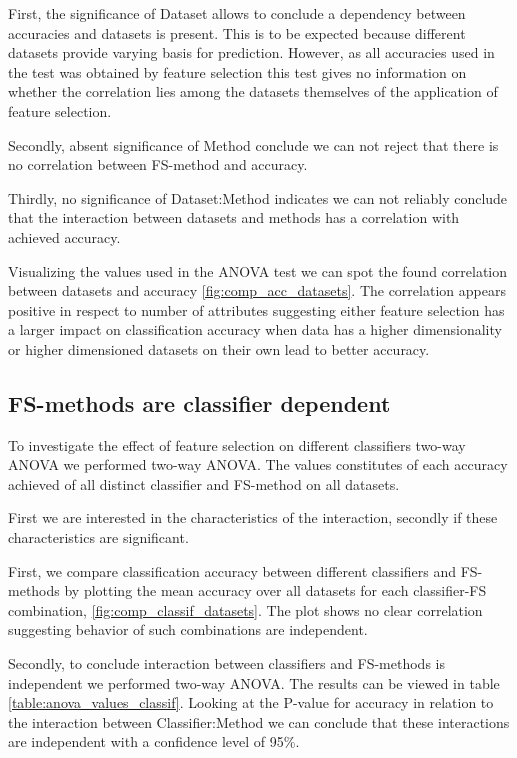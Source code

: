 First, the significance of Dataset allows to conclude a dependency between accuracies and datasets is present. This is to be expected because different datasets provide varying basis for prediction. However, as all accuracies used in the test was obtained by feature selection this test gives no information on whether the correlation lies among the datasets themselves of the application of feature selection.

Secondly, absent significance of Method conclude we can not reject that there is no correlation between FS-method and accuracy.

Thirdly, no significance of Dataset:Method indicates we can not reliably conclude that the interaction between datasets and methods has a correlation with achieved accuracy.

Visualizing the values used in the ANOVA test we can spot the found correlation between datasets and accuracy \ref{fig:comp_acc_datasets}. The correlation appears positive in respect to number of attributes suggesting either feature selection has a larger impact on classification accuracy when data has a higher dimensionality or higher dimensioned datasets on their own lead to better accuracy.



\subsection{FS-methods are classifier dependent}
\label{sec:fs_methods_classifiers}

To investigate the effect of feature selection on different classifiers two-way ANOVA we performed two-way ANOVA. The values constitutes of each accuracy achieved of all distinct classifier and FS-method on all datasets.

First we are interested in the characteristics of the interaction, secondly if these characteristics are significant.

First, we compare classification accuracy between different classifiers and FS-methods by plotting the mean accuracy over all datasets for each classifier-FS combination, \ref{fig:comp_classif_datasets}. The plot shows no clear correlation suggesting behavior of such combinations are independent.

Secondly, to conclude interaction between classifiers and FS-methods is independent we performed two-way ANOVA. The results can be viewed in table \ref{table:anova_values_classif}. Looking at the P-value for accuracy in relation to the interaction between Classifier:Method we can conclude that these interactions are independent with a confidence level of 95\%.

